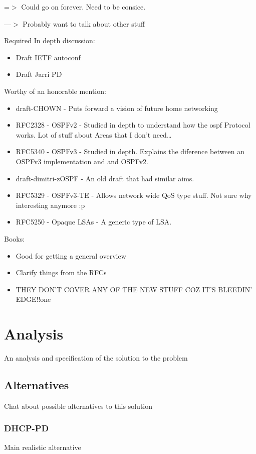 \documentclass[12pt]{report}
\begin{document}
=$>$ Could go on forever. Need to be consice. 

---$>$ Probably want to talk about other stuff

Required In depth discussion:
\begin{itemize}
\item Draft IETF autoconf 
\item Draft Jarri PD
\end{itemize}

Worthy of an honorable mention:

\begin{itemize}
\item draft-CHOWN - Puts forward a vision of future home networking
\item RFC2328 - OSPFv2 - Studied in depth to understand how the ospf Protocol works. Lot of stuff about Areas that I don't need\ldots
\item RFC5340 - OSPFv3 - Studied in depth. Explains the diference between an OSPFv3 implementation and and OSPFv2.
\item draft-dimitri-zOSPF - An old draft that had similar aims.
\item RFC5329 - OSPFv3-TE - Allows network wide QoS type stuff. Not sure why interesting anymore :p
\item RFC5250 - Opaque LSAs - A generic type of LSA. 
\end{itemize}

Books:

\begin{itemize}
\item Good for getting a general overview
\item Clarify things from the RFCs 
\item THEY DON'T COVER ANY OF THE NEW STUFF COZ IT'S BLEEDIN' EDGE!!one
\end{itemize}

\chapter{Analysis}
An analysis and specification of the solution to the problem

\section{Alternatives}
Chat about possible alternatives to this solution

\subsection{DHCP-PD}
Main realistic alternative
\end{document}
